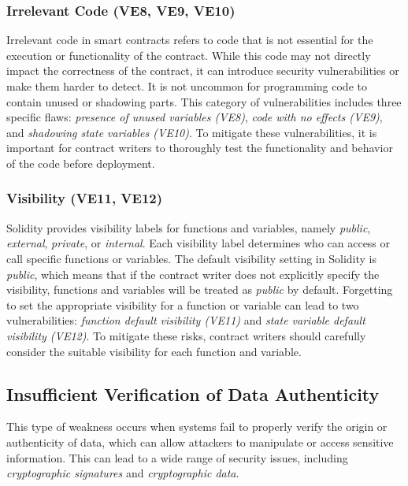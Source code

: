 \documentclass[manuscript,screen]{acmart}
\begin{document}
\subsubsection{Irrelevant Code (VE8, VE9, VE10)}
Irrelevant code in smart contracts refers to code that is not essential for the execution or functionality of the contract. While this code may not directly impact the correctness of the contract, it can introduce security vulnerabilities or make them harder to detect. It is not uncommon for programming code to contain unused or shadowing parts. This category of vulnerabilities includes three specific flaws: \textit{presence of unused variables (VE8)}, \textit{code with no effects (VE9)}, and \textit{shadowing state variables (VE10)}. To mitigate these vulnerabilities, it is important for contract writers to thoroughly test the functionality and behavior of the code before deployment. 


\subsubsection{Visibility (VE11, VE12)}
Solidity provides visibility labels for functions and variables, namely \textit{public}, \textit{external}, \textit{private}, or \textit{internal}. Each visibility label determines who can access or call specific functions or variables. The default visibility setting in Solidity is \textit{public}, which means that if the contract writer does not explicitly specify the visibility, functions and variables will be treated as \textit{public} by default. Forgetting to set the appropriate visibility for a function or variable can lead to two vulnerabilities: \textit{function default visibility (VE11)} and \textit{state variable default visibility (VE12)}. To mitigate these risks, contract writers should carefully consider the suitable visibility for each function and variable. 


\subsection{Insufficient Verification of Data Authenticity}
This type of weakness occurs when systems fail to properly verify the origin or authenticity of data, which can allow attackers to manipulate or access sensitive information. This can lead to a wide range of security issues, including \textit{cryptographic signatures} and \textit{cryptographic data}.
\end{document}

